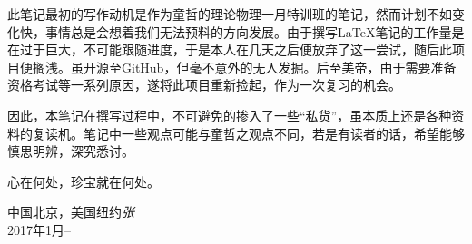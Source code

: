 % 
% 
\preface



此笔记最初的写作动机是作为童哲的理论物理一月特训班的笔记，然而计划不如变化快，事情总是会想着我们无法预料的方向发展。由于撰写\LaTeX 笔记的工作量是在过于巨大，不可能跟随进度，于是本人在几天之后便放弃了这一尝试，随后此项目便搁浅。虽开源至GitHub，但毫不意外的无人发掘。后至美帝，由于需要准备资格考试等一系列原因，遂将此项目重新捡起，作为一次复习的机会。

因此，本笔记在撰写过程中，不可避免的掺入了一些“私货”，虽本质上还是各种资料的复读机。笔记中一些观点可能与童哲之观点不同，若是有读者的话，希望能够慎思明辨，深究悉讨。

心在何处，珍宝就在何处。

\vspace{1cm}
\begin{flushleft}\noindent
中国北京，美国纽约\hfill {\it 张}\\
2017年1月-- \\
\end{flushleft}